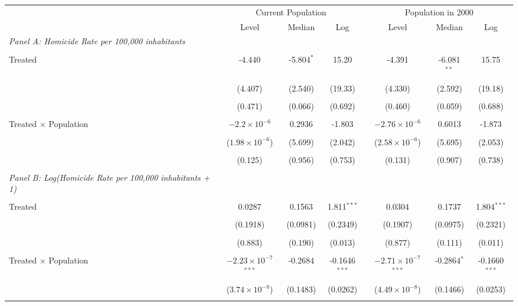 \documentclass[12pt]{article}
\begin{document}
\begin{table}[htbp]
   \centering
   \begin{adjustbox}{width=\textwidth,center}
   \begin{tabular}{lcccccc}
      \tabularnewline \midrule \midrule
      & \multicolumn{3}{c}{Current Population} & \multicolumn{3}{c}{Population in 2000} \\
      \cmidrule(lr){2-4} \cmidrule(lr){5-7}
      & Level & Median & Log & Level & Median & Log \\
      \midrule
      \emph{Panel A: Homicide Rate per 100,000 inhabitants} \\\\
      Treated & -4.440 & -5.804$^{*}$ & 15.20 & -4.391 & -6.081$^{**}$ & 15.75 \\\\
      & (4.407) & (2.540) & (19.33) & (4.330) & (2.592) & (19.18) \\\\
      & (0.471) & (0.066) & (0.692) & (0.460) & (0.059) & (0.688) \\\\
      Treated $\times$ Population & $-2.2\times 10^{-6}$ & 0.2936 & -1.803 & $-2.76\times 10^{-6}$ & 0.6013 & -1.873 \\\\
      & ($1.98\times 10^{-6}$) & (5.699) & (2.042) & ($2.58\times 10^{-6}$) & (5.695) & (2.053) \\\\
      & (0.125) & (0.956) & (0.753) & (0.131) & (0.907) & (0.738) \\\\
      \midrule
      \emph{Panel B: Log(Homicide Rate per 100,000 inhabitants + 1)} \\\\
      Treated & 0.0287 & 0.1563 & 1.811$^{***}$ & 0.0304 & 0.1737 & 1.804$^{***}$ \\\\
      & (0.1918) & (0.0981) & (0.2349) & (0.1907) & (0.0975) & (0.2321) \\\\
      & (0.883) & (0.190) & (0.013) & (0.877) & (0.111) & (0.011) \\\\
      Treated $\times$ Population & $-2.23\times 10^{-7}$$^{***}$ & -0.2684 & -0.1646$^{***}$ & $-2.71\times 10^{-7}$$^{***}$ & -0.2864$^{*}$ & -0.1660$^{***}$ \\\\
      & ($3.74\times 10^{-8}$) & (0.1483) & (0.0262) & ($4.49\times 10^{-8}$) & (0.1466) & (0.0253) \\\\

\end{tabular}
\end{adjustbox}
\end{table}
\end{document}
